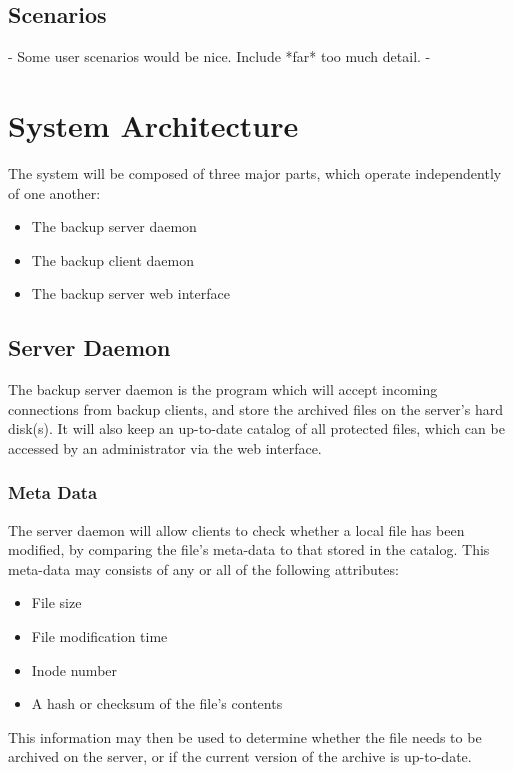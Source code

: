 \subsection{Scenarios}

 - Some user scenarios would be nice. Include *far* too much detail. -

\section{System Architecture}

The system will be composed of three major parts, which operate independently
of one another:

\begin{itemize}
    \item The backup server daemon
    \item The backup client daemon
    \item The backup server web interface
\end{itemize}

\subsection{Server Daemon}

The backup server daemon is the program which will accept incoming connections
from backup clients, and store the archived files on the server's hard disk(s).
It will also keep an up-to-date catalog of all protected files, which can be
accessed by an administrator via the web interface.

\subsubsection{Meta Data}

The server daemon will allow clients to check whether a local file has been
modified, by comparing the file's meta-data to that stored in the catalog. This
meta-data may consists of any or all of the following attributes:

\begin{itemize}
    \item File size
    \item File modification time
    \item Inode number
    \item A hash or checksum of the file's contents
\end{itemize}

This information may then be used to determine whether the file needs to be
archived on the server, or if the current version of the archive is up-to-date.

